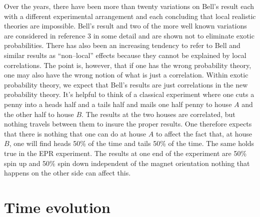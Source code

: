 \documentclass[12pt]{article}
\begin{document}
   Over the years, there have been more than twenty variations on Bell's 
result each with a different experimental arrangement and each concluding
that local realistic theories are impossible.  Bell's result and two of 
the more well known variations are considered in reference 3 in some detail
and are shown not to eliminate exotic probabilities.  There has also been
an increasing tendency to refer to Bell and similar results as ``non--local''
effects because they cannot be explained by local correlations\cite{pl}.  The point
is, however, that if one has the wrong probability theory, one may also have the
wrong notion of what is just a correlation.  Within exotic probability theory,
we expect that Bell's results are just correlations in the new probability theory.
It's helpful to think of a classical experiment where one cuts a penny into
a heads half and a tails half and mails one half penny to house $A$ and the
other half to house $B$.  The 
results at the two houses are correlated, but nothing travels between them 
to insure the proper results.  One therefore expects that there is nothing
that one can do at house $A$ to affect the fact that, at house $B$, one will
find heads 50\% of the time and tails 50\% of the time.  The same
holds true in the EPR experiment.  
The results at one end of the experiment are
50\% spin up and 50\% spin down independent of the magnet orientation
nothing that happens on the other side can affect this.
  
\section{Time evolution}
\end{document}
